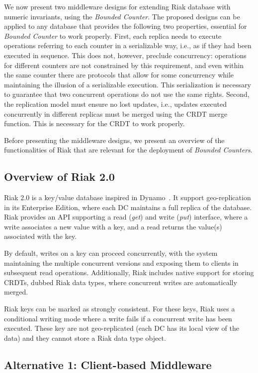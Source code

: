 \documentclass[conference]{IEEEtran}
\newcommand{\InvCounter}{\emph{Bounded Counter}}
\newcommand{\InvCounters}{\emph{Bounded Counters}}
\begin{document}
We now present two middleware designs for extending Riak database with numeric
invariants, using the \InvCounter{}.
The proposed designs can be applied to any database that provides the following
two properties, essential for \InvCounter{} to work properly.
First, each replica needs to execute operations referring to each counter in a serializable way, i.e., as if they had been executed in sequence. This does not, however, preclude concurrency: operations for different counters are not constrained by this requirement, and even within the same counter there are protocols that allow for some concurrency while maintaining the illusion of a serializable execution.
This serialization is necessary to guarantee that two concurrent operations do not use the same
rights.
Second, the replication model must ensure no lost updates, i.e., updates executed
concurrently in different replicas must be merged using the CRDT merge function.
This is necessary for the CRDT to work properly.

Before presenting the middleware designs, we present an overview of the 
functionalities of Riak that are relevant for the deployment of \InvCounters{}.




\subsection{Overview of Riak 2.0}

Riak 2.0 is a key/value database inspired in Dynamo~\cite{dynamo}.
It support geo-replication in its Enterprise Edition, where each DC 
maintains a full replica of the database.
Riak provides an API supporting a read (\emph{get}) and write (\emph{put})
interface, where a
write associates a new value with a key, and a read
returns the value(s) associated with the key.

By default, writes on a key can proceed concurrently, with the system
maintaining the multiple concurrent versions and exposing them to clients
in subsequent read operations.
Additionally, Riak includes native support for storing CRDTs, dubbed Riak data types,
where concurrent writes are automatically merged. 

Riak keys can be marked as strongly consistent. For these keys, 
Riak uses a conditional writing mode where a write fails if a 
concurrent write has been executed.
These key are not geo-replicated (each DC has its local view
of the data) and they cannot store a Riak data type object.


\subsection{Alternative 1: Client-based Middleware}\label{sec:deploy:cltlib}
\end{document}
